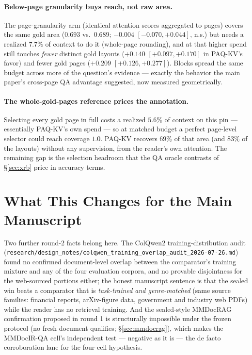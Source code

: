 \documentclass[letterpaper]{article} %
\newcommand{\paqc}{\textsc{PAQ-KV}}
\begin{document}
\paragraph{Below-page granularity buys reach, not raw area.} The page-granularity arm (identical attention scores aggregated to pages) covers the same gold area ($0.693$ vs.\ $0.689$; $-0.004$ $[-0.070,+0.044]$, n.s.) but needs a realized $7.7\%$ of context to do it (whole-page rounding), and at that higher spend still touches \emph{fewer} distinct gold layouts ($+0.140$ $[+0.097,+0.170]$ in \paqc{}'s favor) and fewer gold pages ($+0.209$ $[+0.126,+0.277]$). Blocks spread the same budget across more of the question's evidence --- exactly the behavior the main paper's cross-page QA advantage suggested, now measured geometrically.

\paragraph{The whole-gold-pages reference prices the annotation.} Selecting every gold page in full costs a realized $5.6\%$ of context on this pin --- essentially \paqc{}'s own spend --- so at matched budget a perfect page-level selector could reach coverage $1.0$. \paqc{} recovers $69\%$ of that area (and $83\%$ of the layouts) without any supervision, from the reader's own attention. The remaining gap is the selection headroom that the QA oracle contrasts of \S\ref{sec:xrb} price in accuracy terms.

\section{What This Changes for the Main Manuscript}\label{sec:implications}

Two further round-2 facts belong here. The ColQwen2 training-distribution audit (\texttt{research/design\_notes/colqwen\_training\_overlap\_audit\_2026-07-26.md}) found no confirmed document-level overlap between the comparator's training mixture and any of the four evaluation corpora, and no provable disjointness for the web-sourced portions either; the honest manuscript sentence is that the sealed win beats a comparator that is \emph{task-trained and genre-matched} (same source families: financial reports, arXiv-figure data, government and industry web PDFs) while the reader has no retrieval training. And the sealed-style MMDocRAG confirmation proposed in round 1 is structurally impossible under the frozen protocol (no fresh document qualifies; \S\ref{sec:mmdocrag}), which makes the MMDocIR-QA cell's independent test --- negative as it is --- the de facto corroboration lane for the four-cell hypothesis.
\end{document}
